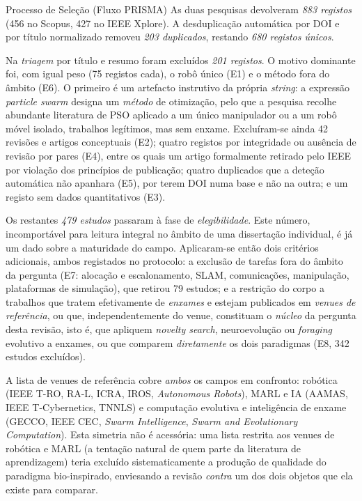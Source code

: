 \documentclass[12pt,reqno, twoside]{amsbook}
\makeatletter
\def\subsection{\@startsection{subsection}{2}%
      \z@{.5\linespacing\@plus.7\linespacing}{.25\linespacing}%
      {\normalfont\bfseries\flushleft}}
\theoremstyle{plain}
\numberwithin{equation}{chapter}
\numberwithin{section}{chapter}
\numberwithin{table}{chapter}
\numberwithin{figure}{chapter}
\makeatother
\begin{document}
\subsection{Processo de Seleção (Fluxo PRISMA)}
As duas pesquisas devolveram \emph{883 registos} (456 no Scopus, 427 no IEEE Xplore). A desduplicação automática por DOI e por título normalizado removeu \emph{203 duplicados}, restando \emph{680 registos únicos}.

Na \emph{triagem} por título e resumo foram excluídos \emph{201 registos}. O motivo dominante foi, com igual peso (75 registos cada), o robô único (E1) e o método fora do âmbito (E6). O primeiro é um artefacto instrutivo da própria \textit{string}: a expressão \textit{particle swarm} designa um \emph{método} de otimização, pelo que a pesquisa recolhe abundante literatura de PSO aplicado a um único manipulador ou a um robô móvel isolado, trabalhos legítimos, mas sem enxame. Excluíram-se ainda 42 revisões e artigos conceptuais (E2); quatro registos por integridade ou ausência de revisão por pares (E4), entre os quais um artigo formalmente retirado pelo IEEE por violação dos princípios de publicação; quatro duplicados que a deteção automática não apanhara (E5), por terem DOI numa base e não na outra; e um registo sem dados quantitativos (E3).

Os restantes \emph{479 estudos} passaram à fase de \emph{elegibilidade}. Este número, incomportável para leitura integral no âmbito de uma dissertação individual, é já um dado sobre a maturidade do campo. Aplicaram-se então dois critérios adicionais, ambos registados no protocolo: a exclusão de tarefas fora do âmbito da pergunta (E7: alocação e escalonamento, SLAM, comunicações, manipulação, plataformas de simulação), que retirou 79 estudos; e a restrição do corpo a trabalhos que tratem efetivamente de \emph{enxames} e estejam publicados em \emph{venues de referência}, ou que, independentemente do venue, constituam o \emph{núcleo} da pergunta desta revisão, isto é, que apliquem \textit{novelty search}, neuroevolução ou \textit{foraging} evolutivo a enxames, ou que comparem \emph{diretamente} os dois paradigmas (E8, 342 estudos excluídos).

A lista de venues de referência cobre \emph{ambos} os campos em confronto: robótica (IEEE T-RO, RA-L, ICRA, IROS, \textit{Autonomous Robots}), MARL e IA (AAMAS, IEEE T-Cybernetics, TNNLS) e computação evolutiva e inteligência de enxame (GECCO, IEEE CEC, \textit{Swarm Intelligence}, \textit{Swarm and Evolutionary Computation}). Esta simetria não é acessória: uma lista restrita aos venues de robótica e MARL (a tentação natural de quem parte da literatura de aprendizagem) teria excluído sistematicamente a produção de qualidade do paradigma bio-inspirado, enviesando a revisão \emph{contra} um dos dois objetos que ela existe para comparar.
\end{document}
